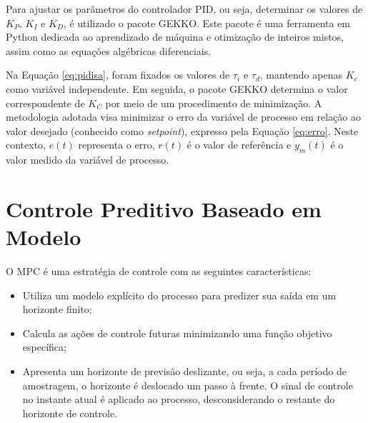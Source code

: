 \documentclass[12pt,           %
a4paper,                       %
openany,                       %
oneside,                       %
chapter=TITLE,                 %
english,                       %
spanish,                       %
brazil,                        %
sumario=tradicional]{abntex2}  %
\begin{document}
\begin{OnehalfSpace}
\begin{figure}[H]
    \label{fig:pidmf}
\end{figure}
\vspace*{-0.7cm}
{\raggedright {}}

Para ajustar os parâmetros do controlador PID, ou seja, determinar os valores de $K_P$, $K_I$ e $K_D$, é utilizado o pacote GEKKO\cite{gekko}. Este pacote é uma ferramenta em Python dedicada ao aprendizado de máquina e otimização de inteiros mistos, assim como as equações algébricas diferenciais.

Na Equação \ref{eq:pidisa}, foram fixados os valores de $\tau_i$ e $\tau_d$, mantendo apenas $K_c$ como variável independente. Em seguida, o pacote GEKKO determina o valor correspondente de $K_C$ por meio de um procedimento de minimização. A metodologia adotada visa minimizar o erro da variável de processo em relação ao valor desejado (conhecido como \textit{setpoint}), expresso pela Equação \ref{eq:erro}. Neste contexto, $e(t)$ representa o erro, $r(t)$ é o valor de referência e $y_m(t)$ é o valor medido da variável de processo.

\section{Controle Preditivo Baseado em Modelo}
\label{Controle Preditivo Baseado em Modelo}

O MPC é uma estratégia de controle com as seguintes características:

\begin{itemize}
    \item Utiliza um modelo explícito do processo para predizer sua saída em um horizonte finito;
    \item Calcula as ações de controle futuras minimizando uma função objetivo específica;
    \item Apresenta um horizonte de previsão deslizante, ou seja, a cada período de amostragem, o horizonte é deslocado um passo à frente. O sinal de controle no instante atual é aplicado ao processo, desconsiderando o restante do horizonte de controle.
\end{itemize}


\end{OnehalfSpace}
\end{document}
